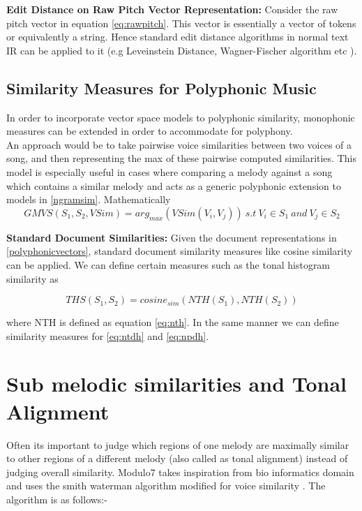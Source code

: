 \noindent \textbf{Edit Distance on Raw Pitch Vector Representation:} Consider the raw pitch vector in equation \ref{eq:rawpitch}. This vector is essentially a vector of tokens or equivalently a string. Hence standard edit distance algorithms in normal text IR can be applied to it (e.g Leveinstein Distance, Wagner-Fischer algorithm etc \cite{simtour}).

\subsection{Similarity Measures for Polyphonic Music} \label{polyphonicsim}

\noindent In order to incorporate vector space models to polyphonic similarity, monophonic measures can be extended in order to accommodate for polyphony.\\

 An approach would be to take pairwise voice similarities between two voices of a song, and then representing the max of these pairwise computed similarities. This model is especially useful in cases where comparing a melody against a song which contains a similar melody and acts as a generic polyphonic extension to models in \ref{ngramsim}. Mathematically 
\begin{equation}
GMVS(S_1, S_2, VSim) = arg_{max} (VSim(V_i, V_j)) \ s.t \ V_i \in S_1 \ and \ V_j \in S_2
\end{equation}

\noindent \textbf{Standard Document Similarities: } Given the document representations in \ref{polyphonicvectors}, standard document similarity measures like cosine similarity can be applied. We can define certain measures such as the tonal histogram similarity as 

\begin{equation}
THS(S_1, S_2) = cosine_{sim} (NTH(S_1), NTH(S_2))
\end{equation}

\noindent where NTH is defined as equation \ref{eq:nth}. In the same manner we can define similarity measures for \ref{eq:ntdh} and \ref{eq:npdh}.

\section{Sub melodic similarities and Tonal Alignment} \label{sim:unequal}

\noindent Often its important to judge which regions of one melody are maximally similar to other regions of a different melody (also called as tonal alignment) instead of judging overall similarity. Modulo7 takes inspiration from bio informatics domain and uses the smith waterman algorithm modified for voice similarity \cite{smithWatermanBook}. The algorithm is as follows:-


